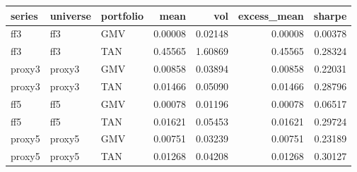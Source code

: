 \begin{tabular}{lllrrrr}
\toprule
series & universe & portfolio & mean & vol & excess\_mean & sharpe \\
\midrule
ff3 & ff3 & GMV & 0.00008 & 0.02148 & 0.00008 & 0.00378 \\
ff3 & ff3 & TAN & 0.45565 & 1.60869 & 0.45565 & 0.28324 \\
proxy3 & proxy3 & GMV & 0.00858 & 0.03894 & 0.00858 & 0.22031 \\
proxy3 & proxy3 & TAN & 0.01466 & 0.05090 & 0.01466 & 0.28796 \\
ff5 & ff5 & GMV & 0.00078 & 0.01196 & 0.00078 & 0.06517 \\
ff5 & ff5 & TAN & 0.01621 & 0.05453 & 0.01621 & 0.29724 \\
proxy5 & proxy5 & GMV & 0.00751 & 0.03239 & 0.00751 & 0.23189 \\
proxy5 & proxy5 & TAN & 0.01268 & 0.04208 & 0.01268 & 0.30127 \\
\bottomrule
\end{tabular}

